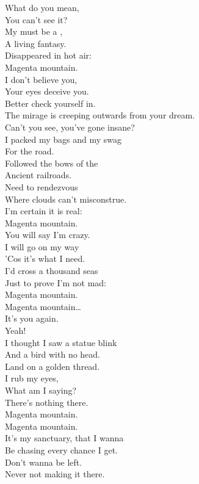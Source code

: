 What do you mean, \\
You can't see it? \\
My  must be a , \\
A living fantasy. \\
Disappeared in hot air: \\
Magenta mountain. \\

I don't believe you, \\
Your eyes deceive you. \\
Better check yourself in. \\
The mirage is creeping outwards from your dream. \\
Can't you see, you've gone insane? \\

I packed my bags and my swag \\
For the road. \\
Followed the bows of the \\
Ancient railroads. \\
Need to rendezvous \\
Where clouds can't misconstrue. \\
I'm certain it is real: \\
Magenta mountain. \\

You will say I'm crazy. \\
I will go on my way \\
'Cos it's what I need. \\
I'd cross a thousand seas \\
Just to prove I'm not mad: \\
Magenta mountain. \\

Magenta mountain… \\

It's you again. \\
Yeah! \\
I thought I saw a statue blink \\
And a bird with no head. \\
Land on a golden thread. \\
I rub my eyes, \\
What am I saying? \\
There's nothing there. \\

Magenta mountain. \\
Magenta mountain. \\
It's my sanctuary, that I wanna \\
Be chasing every chance I get. \\
Don't wanna be left. \\
Never not making it there. \\

